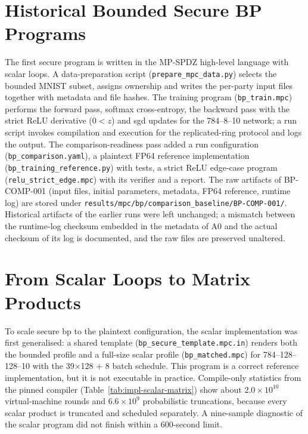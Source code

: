 \section{Historical Bounded Secure BP Programs}\label{sec:impl-secure}
The first secure program is written in the MP-SPDZ high-level language with scalar loops. A data-preparation script (\texttt{prepare\_\allowbreak mpc\_\allowbreak data.py}) selects the bounded MNIST subset, assigns ownership and writes the per-party input files together with metadata and file hashes. The training program (\texttt{bp\_\allowbreak train.mpc}) performs the forward pass, softmax cross-entropy, the backward pass with the strict ReLU derivative ($0<z$) and \ac{sgd} updates for the 784--8--10 network; a run script invokes compilation and execution for the replicated-ring protocol and logs the output. The comparison-readiness pass added a run configuration (\texttt{bp\_\allowbreak comparison.yaml}), a plaintext FP64 reference implementation (\texttt{bp\_\allowbreak training\_\allowbreak reference.py}) with tests, a strict ReLU edge-case program (\texttt{relu\_\allowbreak strict\_\allowbreak edge.mpc}) with its verifier and a report. The raw artifacts of BP-COMP-001 (input files, initial parameters, metadata, FP64 reference, runtime log) are stored under \texttt{results/\allowbreak mpc/\allowbreak bp/\allowbreak comparison\_\allowbreak baseline/\allowbreak BP-COMP-001/}. Historical artifacts of the earlier runs were left unchanged; a mismatch between the runtime-log checksum embedded in the metadata of A0 and the actual checksum of its log is documented, and the raw files are preserved unaltered.

\section{From Scalar Loops to Matrix Products}\label{sec:impl-scalar}
To scale secure \ac{bp} to the plaintext configuration, the scalar implementation was first generalised: a shared template (\texttt{bp\_\allowbreak secure\_\allowbreak template.mpc.in}) renders both the bounded profile and a full-size scalar profile (\texttt{bp\_\allowbreak matched.mpc}) for 784--128--128--10 with the 39$\times$128 + 8 batch schedule. This program is a correct reference implementation, but it is not executable in practice. Compile-only statistics from the pinned compiler (Table~\ref{tab:impl-scalar-matrix}) show about $2.0\times10^{10}$ virtual-machine rounds and $6.6\times10^{9}$ probabilistic truncations, because every scalar product is truncated and scheduled separately. A nine-sample diagnostic of the scalar program did not finish within a 600-second limit.

